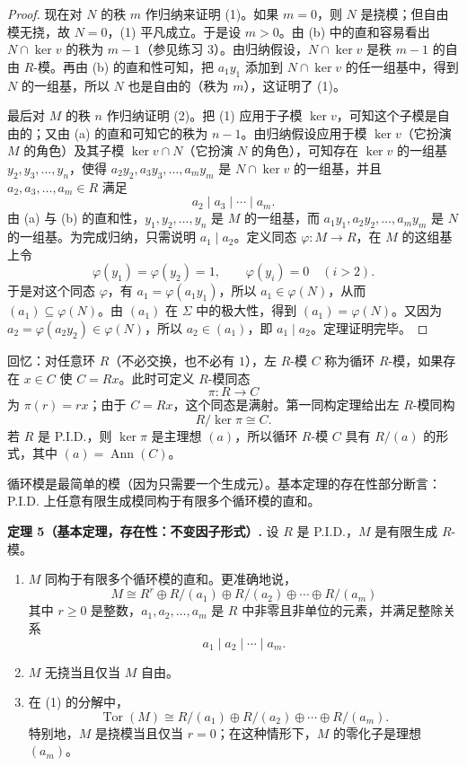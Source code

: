\begin{proof}
现在对 $N$ 的秩 $m$ 作归纳来证明 (1)。如果 $m=0$，则 $N$ 是挠模；但自由模无挠，故 $N=0$，(1) 平凡成立。于是设 $m>0$。由 (b) 中的直和容易看出 $N\cap\ker v$ 的秩为 $m-1$（参见练习 3）。由归纳假设，$N\cap\ker v$ 是秩 $m-1$ 的自由 $R$-模。再由 (b) 的直和性可知，把 $a_1y_1$ 添加到 $N\cap\ker v$ 的任一组基中，得到 $N$ 的一组基，所以 $N$ 也是自由的（秩为 $m$），这证明了 (1)。

最后对 $M$ 的秩 $n$ 作归纳证明 (2)。把 (1) 应用于子模 $\ker v$，可知这个子模是自由的；又由 (a) 的直和可知它的秩为 $n-1$。由归纳假设应用于模 $\ker v$（它扮演 $M$ 的角色）及其子模 $\ker v\cap N$（它扮演 $N$ 的角色），可知存在 $\ker v$ 的一组基 $y_2,y_3,\ldots,y_n$，使得 $a_2y_2,a_3y_3,\ldots,a_my_m$ 是 $N\cap\ker v$ 的一组基，并且 $a_2,a_3,\ldots,a_m\in R$ 满足
\[
a_2\mid a_3\mid\cdots\mid a_m.
\]
由 (a) 与 (b) 的直和性，$y_1,y_2,\ldots,y_n$ 是 $M$ 的一组基，而 $a_1y_1,a_2y_2,\ldots,a_my_m$ 是 $N$ 的一组基。为完成归纳，只需说明 $a_1\mid a_2$。定义同态 $\varphi:M\to R$，在 $M$ 的这组基上令
\[
\varphi(y_1)=\varphi(y_2)=1,
\qquad
\varphi(y_i)=0\quad(i>2).
\]
于是对这个同态 $\varphi$，有 $a_1=\varphi(a_1y_1)$，所以 $a_1\in\varphi(N)$，从而 $(a_1)\subseteq\varphi(N)$。由 $(a_1)$ 在 $\Sigma$ 中的极大性，得到 $(a_1)=\varphi(N)$。又因为 $a_2=\varphi(a_2y_2)\in\varphi(N)$，所以 $a_2\in(a_1)$，即 $a_1\mid a_2$。定理证明完毕。
\end{proof}

回忆：对任意环 $R$（不必交换，也不必有 $1$），左 $R$-模 $C$ 称为循环 $R$-模，如果存在 $x\in C$ 使 $C=Rx$。此时可定义 $R$-模同态
\[
\pi:R\longrightarrow C
\]
为 $\pi(r)=rx$；由于 $C=Rx$，这个同态是满射。第一同构定理给出左 $R$-模同构
\[
R/\ker\pi\cong C.
\]
若 $R$ 是 P.I.D.，则 $\ker\pi$ 是主理想 $(a)$，所以循环 $R$-模 $C$ 具有 $R/(a)$ 的形式，其中 $(a)=\operatorname{Ann}(C)$。

循环模是最简单的模（因为只需要一个生成元）。基本定理的存在性部分断言：P.I.D. 上任意有限生成模同构于有限多个循环模的直和。

\noindent\textbf{定理 5（基本定理，存在性：不变因子形式）.} 设 $R$ 是 P.I.D.，$M$ 是有限生成 $R$-模。
\begin{enumerate}[label=(\arabic*)]
\item $M$ 同构于有限多个循环模的直和。更准确地说，
\[
M\cong R^r\oplus R/(a_1)\oplus R/(a_2)\oplus\cdots\oplus R/(a_m)
\]
其中 $r\geq0$ 是整数，$a_1,a_2,\ldots,a_m$ 是 $R$ 中非零且非单位的元素，并满足整除关系
\[
a_1\mid a_2\mid\cdots\mid a_m.
\]
\item $M$ 无挠当且仅当 $M$ 自由。
\item 在 (1) 的分解中，
\[
\operatorname{Tor}(M)\cong R/(a_1)\oplus R/(a_2)\oplus\cdots\oplus R/(a_m).
\]
特别地，$M$ 是挠模当且仅当 $r=0$；在这种情形下，$M$ 的零化子是理想 $(a_m)$。
\end{enumerate}

